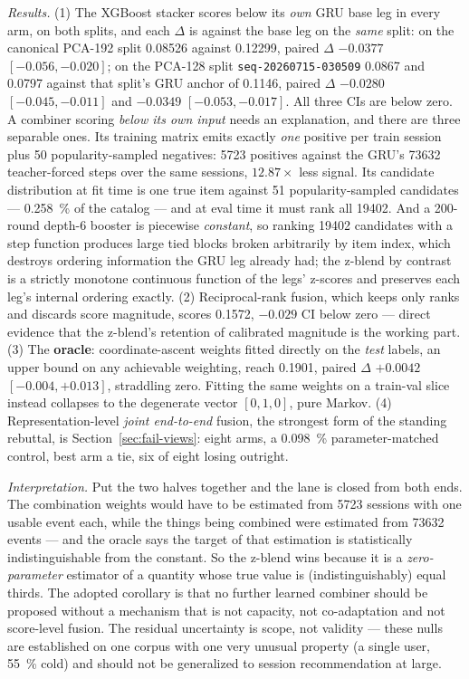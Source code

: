 \documentclass[11pt]{article}
\newcommand{\dsid}[1]{\texttt{\small #1}}
\begin{document}
\emph{Results.} (1) The XGBoost stacker scores below its \emph{own} GRU base leg
in every arm, on both splits, and each $\Delta$ is against the base leg on the
\emph{same} split: on the canonical PCA-192 split \num{0.08526} against
\num{0.12299}, paired $\Delta$ $-\num{0.0377}$
$[-\num{0.056},-\num{0.020}]$; on the PCA-128 split
\dsid{seq-20260715-030509} \num{0.0867} and \num{0.0797} against that split's
GRU anchor of \num{0.1146}, paired $\Delta$ $-\num{0.0280}$
$[-\num{0.045},-\num{0.011}]$ and $-\num{0.0349}$
$[-\num{0.053},-\num{0.017}]$. All three CIs are below zero. A combiner scoring
\emph{below its own input} needs an explanation, and there are three separable
ones. Its
training matrix emits exactly \emph{one} positive per train session plus \num{50}
popularity-sampled negatives: \num{5723} positives against the GRU's
\num{73632} teacher-forced steps over the same sessions, $12.87\times$ less
signal. Its candidate distribution at fit time is one true item against \num{51}
popularity-sampled candidates --- \SI{0.258}{\percent} of the catalog --- and at
eval time it must rank all \num{19402}. And a \num{200}-round depth-6 booster is
piecewise \emph{constant}, so ranking \num{19402} candidates with a step function
produces large tied blocks broken arbitrarily by item index, which destroys
ordering information the GRU leg already had; the z-blend by contrast is a
strictly monotone continuous function of the legs' z-scores and preserves each
leg's internal ordering exactly. (2) Reciprocal-rank fusion, which keeps only
ranks and discards score magnitude, scores \num{0.1572}, $-\num{0.029}$ CI below
zero --- direct evidence that the z-blend's retention of calibrated magnitude is
the working part. (3) The \textbf{oracle}: coordinate-ascent weights fitted
directly on the \emph{test} labels, an upper bound on any achievable weighting,
reach \num{0.1901}, paired $\Delta$ $+\num{0.0042}$
$[-\num{0.004},+\num{0.013}]$, straddling zero. Fitting the same weights on a
train-val slice instead collapses to the degenerate vector $[0,1,0]$, pure
Markov. (4) Representation-level \emph{joint end-to-end} fusion, the strongest
form of the standing rebuttal, is Section~\ref{sec:fail-views}: eight arms, a
\SI{0.098}{\percent} parameter-matched control, best arm a tie, six of eight
losing outright.

\emph{Interpretation.} Put the two halves together and the lane is closed from
both ends. The combination weights would have to be estimated from \num{5723}
sessions with one usable event each, while the things being combined were
estimated from \num{73632} events --- and the oracle says the target of that
estimation is statistically indistinguishable from the constant. So the z-blend
wins because it is a \emph{zero-parameter} estimator of a quantity whose true
value is (indistinguishably) equal thirds. The adopted corollary is that no
further learned combiner should be proposed without a mechanism that is not
capacity, not co-adaptation and not score-level fusion. The residual uncertainty
is scope, not validity --- these nulls are established on one corpus with one
very unusual property (a single user, \SI{55}{\percent} cold) and should not be
generalized to session recommendation at large.
\end{document}
